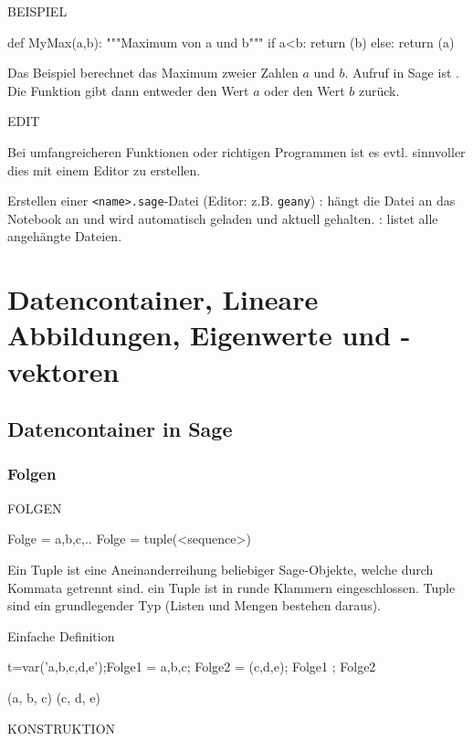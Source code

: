 \documentclass[fontsize=12pt,paper=a4,twoside,bibtotoc,idxtotoc,
liststotoc,pagesize,BCOR1.2cm,DIV15,chapterprefix,pagesize=pdftex]{scrbook}
\theoremstyle{plain}
\theoremstyle{definition}
\theoremstyle{remark}
\begin{document}
BEISPIEL

\begin{sagein}
def MyMax(a,b):
    """Maximum von a und b"""
    if a<b:
        return (b)
    else: 
        return (a)
\end{sagein}

 Das Beispiel berechnet das Maximum zweier Zahlen $a$ und
$b$. 
 Aufruf in Sage ist {\color{blue} }. 
 Die Funktion gibt dann entweder den Wert $a$ oder den Wert $b$
  zurück.
  

EDIT

Bei umfangreicheren Funktionen oder richtigen Programmen ist es evtl. sinnvoller dies mit
einem Editor zu erstellen. 


  Erstellen einer \verb+<name>.sage+-Datei (Editor: z.B. \verb+geany+)
 : hängt die Datei an das Notebook an und wird automatisch geladen und aktuell gehalten.
 : listet alle angehängte Dateien.


\chapter{Datencontainer, Lineare Abbildungen, Eigenwerte und -vektoren}
\section{Datencontainer in Sage}
\subsection{Folgen}
FOLGEN

\begin{sagein}
 Folge = a,b,c,..
 Folge = tuple(<sequence>)
\end{sagein}


 Ein Tuple ist eine Aneinanderreihung beliebiger Sage-Objekte,
  welche durch Kommata getrennt sind.
 ein Tuple ist in  runde Klammern eingeschlossen.
 Tuple sind ein grundlegender Typ (Listen und Mengen bestehen daraus).

 Einfache Definition
\begin{sagein}
t=var('a,b,c,d,e');Folge1 = a,b,c; Folge2 = (c,d,e); Folge1 ; Folge2
\end{sagein}
\begin{sage}
(a, b, c)
(c, d, e)
\end{sage}
 

KONSTRUKTION
\end{document}
